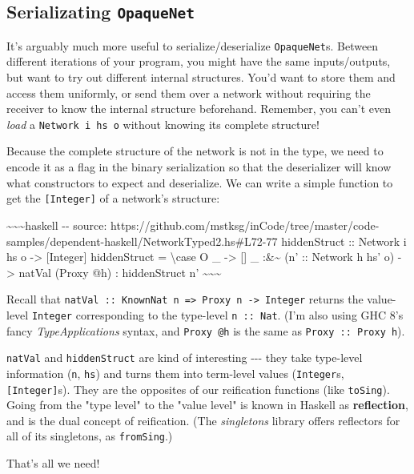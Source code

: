 \documentclass[]{article}
\begin{document}
\subsection{\texorpdfstring{Serializating
\texttt{OpaqueNet}}{Serializating OpaqueNet}}

It's arguably much more useful to serialize/deserialize \texttt{OpaqueNet}s.
Between different iterations of your program, you might have the same
inputs/outputs, but want to try out different internal structures. You'd want to
store them and access them uniformly, or send them over a network without
requiring the receiver to know the internal structure beforehand. Remember, you
can't even \emph{load} a \texttt{Network\ i\ hs\ o} without knowing its complete
structure!

Because the complete structure of the network is not in the type, we need to
encode it as a flag in the binary serialization so that the deserializer will
know what constructors to expect and deserialize. We can write a simple function
to get the \texttt{{[}Integer{]}} of a network's structure:

\textasciitilde{}\textasciitilde{}\textasciitilde{}haskell -\/- source:
https://github.com/mstksg/inCode/tree/master/code-samples/dependent-haskell/NetworkTyped2.hs\#L72-77
hiddenStruct :: Network i hs o -\textgreater{} {[}Integer{]} hiddenStruct =
\textbackslash{}case O \_ -\textgreater{} {[}{]} \_ :\&\textasciitilde{} (n' ::
Network h hs' o) -\textgreater{} natVal (Proxy @h) : hiddenStruct n'
\textasciitilde{}\textasciitilde{}\textasciitilde{}

Recall that
\texttt{natVal\ ::\ KnownNat\ n\ =\textgreater{}\ Proxy\ n\ -\textgreater{}\ Integer}
returns the value-level \texttt{Integer} corresponding to the type-level
\texttt{n\ ::\ Nat}. (I'm also using GHC 8's fancy \emph{TypeApplications}
syntax, and \texttt{Proxy\ @h} is the same as \texttt{Proxy\ ::\ Proxy\ h}).

\texttt{natVal} and \texttt{hiddenStruct} are kind of interesting -\/-\/- they
take type-level information (\texttt{n}, \texttt{hs}) and turns them into
term-level values (\texttt{Integer}s, \texttt{{[}Integer{]}}s). They are the
opposites of our reification functions (like \texttt{toSing}). Going from the
"type level" to the "value level" is known in Haskell as \textbf{reflection},
and is the dual concept of reification. (The \emph{singletons} library offers
reflectors for all of its singletons, as \texttt{fromSing}.)

That's all we need!
\end{document}
